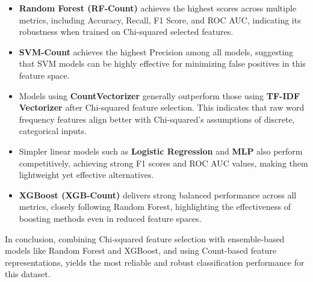 \begin{itemize}
    \item \textbf{Random Forest (RF-Count)} achieves the highest scores across multiple metrics, including Accuracy, Recall, F1 Score, and ROC AUC, indicating its robustness when trained on Chi-squared selected features.
    \item \textbf{SVM-Count} achieves the highest Precision among all models, suggesting that SVM models can be highly effective for minimizing false positives in this feature space.
    \item Models using \textbf{CountVectorizer} generally outperform those using \textbf{TF-IDF Vectorizer} after Chi-squared feature selection. This indicates that raw word frequency features align better with Chi-squared's assumptions of discrete, categorical inputs.
    \item Simpler linear models such as \textbf{Logistic Regression} and \textbf{MLP} also perform competitively, achieving strong F1 scores and ROC AUC values, making them lightweight yet effective alternatives.
    \item \textbf{XGBoost (XGB-Count)} delivers strong balanced performance across all metrics, closely following Random Forest, highlighting the effectiveness of boosting methods even in reduced feature spaces.
\end{itemize}

In conclusion, combining Chi-squared feature selection with ensemble-based models like Random Forest and XGBoost, and using Count-based feature representations, yields the most reliable and robust classification performance for this dataset.

